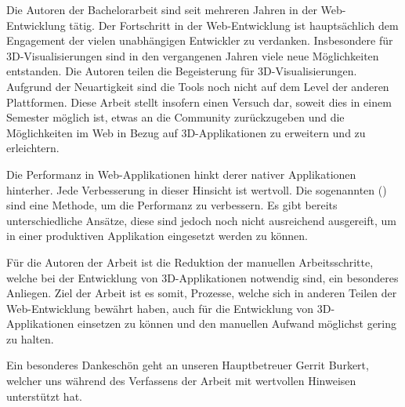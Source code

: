
Die Autoren der Bachelorarbeit sind seit mehreren Jahren in der Web-Entwicklung tätig. Der Fortschritt in der Web-Entwicklung ist hauptsächlich dem Engagement der vielen unabhängigen Entwickler zu verdanken.
Insbesondere für 3D-Visualisierungen sind in den vergangenen Jahren viele neue Möglichkeiten entstanden. Die Autoren teilen die Begeisterung für 3D-Visualisierungen. Aufgrund der Neuartigkeit sind die Tools noch nicht auf dem Level der anderen Plattformen. Diese Arbeit stellt insofern einen Versuch dar, soweit dies in einem Semester möglich ist, etwas an die Community zurückzugeben und die Möglichkeiten im Web in Bezug auf 3D-Applikationen zu erweitern und zu erleichtern.

Die Performanz in Web-Applikationen hinkt derer nativer Applikationen hinterher. Jede Verbesserung in dieser Hinsicht ist wertvoll. Die sogenannten  () sind eine Methode, um die Performanz zu verbessern. Es gibt bereits unterschiedliche Ansätze, diese sind jedoch noch nicht ausreichend ausgereift, um in einer produktiven Applikation eingesetzt werden zu können.

Für die Autoren der Arbeit ist die Reduktion der manuellen Arbeitsschritte, welche bei der Entwicklung von 3D-Applikationen notwendig sind, ein besonderes Anliegen. Ziel der Arbeit ist es somit, Prozesse, welche sich in anderen Teilen der Web-Entwicklung bewährt haben, auch für die Entwicklung von 3D-Applikationen einsetzen zu können und den manuellen Aufwand möglichst gering zu halten.

Ein besonderes Dankeschön geht an unseren Hauptbetreuer Gerrit Burkert, welcher uns während des Verfassens der Arbeit mit wertvollen Hinweisen unterstützt hat.
